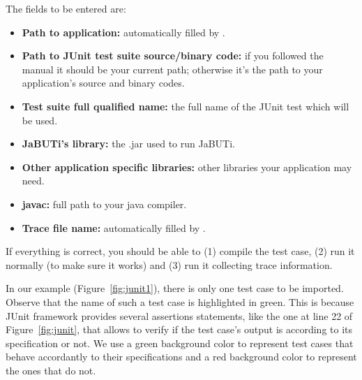 %
%
%



The fields to be entered are:

\begin{itemize}
	\item \textbf{Path to application:} automatically filled by \toolname.
	\item \textbf{Path to JUnit test suite source/binary code:} if you followed 
	the manual it should be your current path; otherwise it's the path to your
	application's source and binary codes.
	\item \textbf{Test suite full qualified name:} the full name of the JUnit test
	which will be used.
	\item \textbf{JaBUTi's library:} the .jar used to run JaBUTi.
	\item \textbf{Other application specific libraries:} other libraries your 
	application may need.
	\item \textbf{javac:} full path to your java compiler.
	\item \textbf{Trace file name:} automatically filled by \toolname.
\end{itemize}

If everything is correct, you should be able to (1) compile the test case, (2)
run it normally (to make sure it works) and (3) run it collecting trace 
information.

In our example (Figure~\ref{fig:junit1}), there is only one test
case to be imported. Observe that the name of such a test case
 is highlighted in green. This is
because JUnit framework provides several assertions statements,
like the one at line 22 of Figure~\ref{fig:junit}, that allows to
verify if the test case's output is according to its specification
or not. We use a green background color to represent test cases
that behave accordantly to their specifications and a red
background color to represent the ones that do not.


